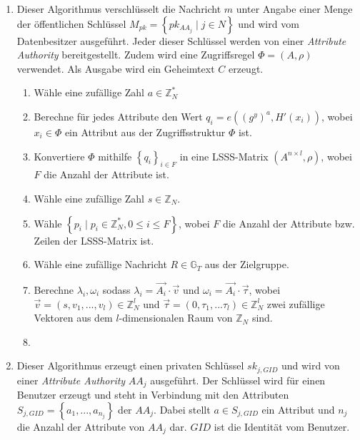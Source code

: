 \begin{enumerate}
	\item {} Dieser Algorithmus
		ver\-schlüs\-selt die Nachricht $m$ unter Angabe einer Menge der
		öffent\-lich\-en Schlüssel $M_{pk} = \left\{ pk_{AA_j} \;\vert\; j \in N
			\right\}$ und wird vom Datenbesitzer ausgeführt. Jeder dieser Schlüssel
			werden von einer \textit{Attribute Authority} bereitgestellt. Zudem wird
			eine Zugriffsregel $\Phi = \left( A, \rho \right)$ verwendet. Als Ausgabe
			wird ein Geheimtext $C$ erzeugt.
		\begin{enumerate}
			\item Wähle eine zufällige Zahl $a \in \mathbb{Z}^*_N$
			\item Berechne für jedes Attribute den Wert $q_i = e((g^y)^a, H'(x_i))$,
				wobei $x_i \in \Phi$ ein Attribut
				aus der Zugriffsstruktur $\Phi$ ist.
			\item Konvertiere $\Phi$ mithilfe $\left\{q_i\right\}_{i \in F}$ in eine
				LSSS-Matrix $\left( A^{n \times l}, \rho \right)$, wobei $F$ die Anzahl
				der Attribute ist.
			\item Wähle eine zufällige Zahl $s \in \mathbb{Z}_N$.
			\item Wähle $\left\{ p_i \;\vert\; p_i \in \mathbb{Z}^*_N, 0 \leq i \le F
				\right\}$, wobei $F$ die Anzahl der Attribute bzw. Zeilen der
				LSSS-Matrix ist.
			\item Wähle eine zufällige Nachricht $R \in \mathbb{G}_T$ aus der
				Zielgruppe.
			\item Berechne $\lambda_i, \omega_i$ sodass $\lambda_i = \vec{A_i} \cdot
				\vec{v}$ und $\omega_i = \vec{A_i} \cdot \vec{\tau}$, wobei $\vec{v} =
				\left( s, v_1, ..., v_l \right) \in \mathbb{Z}^l_N$ und $\vec{\tau} =
				\left( 0, \tau_1, ... \tau_l \right) \in \mathbb{Z}^l_N$ zwei zufällige
				Vektoren aus dem $l$-dimensionalen Raum von $\mathbb{Z}_N$ sind.
			\item 
		\end{enumerate}

	\item\label{enum:phoabe_keygen}  Dieser Algorithmus erzeugt einen privaten
		Schlüssel $sk_{j, GID}$ und wird von einer \textit{Attribute Authority}
		$AA_j$ ausgeführt. Der Schlüssel wird für einen Benutzer erzeugt und steht
		in Verbindung mit den Attributen $S_{j, GID} = \left\{ a_1, ..., a_{n_j}
		\right\}$ der $AA_j$.  Dabei stellt $a \in S_{j, GID}$ ein Attribut und
		$n_j$ die Anzahl der Attribute von $AA_j$ dar. $GID$ ist die Identität vom
		Benutzer.


\end{enumerate}
